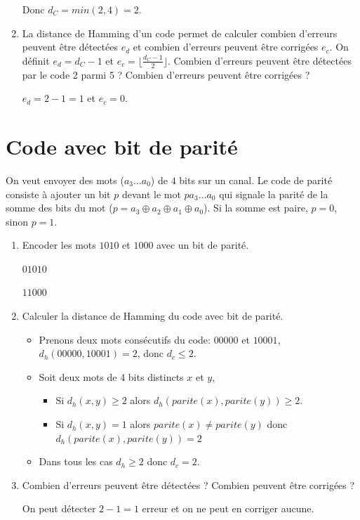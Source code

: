 \documentclass[a4paper,10pt]{exam}
\begin{document}
\begin{enumerate}
\begin{solution}
    Donc $d_C = min(2,4) = 2$.
  \end{solution}

\item La distance de Hamming d'un code permet de calculer combien d'erreurs
  peuvent être détectées $e_d$ et combien d'erreurs peuvent être corrigées $e_c$.
  On définit $e_d = d_C - 1$ et $e_c = \lfloor \frac{d_C-1}{2} \rfloor$.
  Combien d'erreurs peuvent être détectées par le code 2 parmi 5 ?
  Combien d'erreurs peuvent être corrigées ?

  \begin{solution}
    $e_d = 2-1 = 1$ et $e_c = 0$.
  \end{solution}
\end{enumerate}

\section{Code avec bit de parité}
On veut envoyer des mots ($a_3\dots a_0$) de $4$ bits sur un canal. Le code de parité consiste
à ajouter un bit $p$ devant le mot $pa_3\dots a_0$ qui signale la parité de la
somme des bits du mot ($p = a_3 \oplus a_2  \oplus a_1 \oplus a_0$). Si la somme est paire,
$p = 0$, sinon $p = 1$.

\begin{enumerate}
\item Encoder les mots $1010$ et $1000$ avec un bit de parité.
\begin{solution}
  $0 1010$

  $1 1000$
\end{solution}
\item Calculer la distance de Hamming du code avec bit de parité.
\begin{solution}
  \begin{itemize}
  \item Prenons deux mots consécutifs du code: $00000$ et $10001$,
    $d_h(00000,10001) = 2$, donc $d_c \leq 2$.

  \item Soit deux mots de 4 bits distincts $x$ et $y$,
    \begin{itemize}
      \item Si $d_h(x,y) \geq 2$ alors $d_h(parite(x), parite(y)) \geq 2$.
      \item Si $d_h(x,y) = 1$ alors $parite(x) \neq parite(y)$ donc
        $d_h(parite(x), parite(y)) = 2$
    \end{itemize}

  \item Dans tous les cas $d_h \geq 2$ donc $d_c = 2$.
  \end{itemize}
\end{solution}

\item Combien d'erreurs peuvent être détectées ? Combien peuvent être
    corrigées ?
\begin{solution}
  On peut détecter $2-1=1$ erreur et on ne peut en corriger aucune.
\end{solution}
\end{enumerate}
\end{document}
